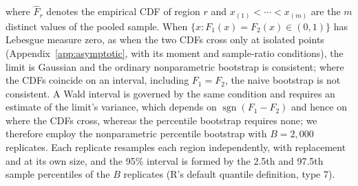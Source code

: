 \documentclass[AMA,Times1COL]{WileyNJDv5}
\begin{document}
where $\hat{F}_r$ denotes the empirical CDF of region $r$ and $x_{(1)} < \cdots < x_{(m)}$ are the $m$ distinct values of the pooled sample. When $\{x : F_1(x) = F_2(x) \in (0,1)\}$ has Lebesgue measure zero, as when the two CDFs cross only at isolated points (Appendix~\ref{app:asymptotic}, with its moment and sample-ratio conditions), the limit is Gaussian and the ordinary nonparametric bootstrap is consistent;\cite{fang2019} where the CDFs coincide on an interval, including $F_1 = F_2$, the naive bootstrap is not consistent.\cite{dumbgen1993,fang2019,sommerfeld2018} A Wald interval is governed by the same condition and requires an estimate of the limit's variance, which depends on $\operatorname{sgn}(F_1 - F_2)$ and hence on where the CDFs cross, whereas the percentile bootstrap requires none; we therefore employ the nonparametric percentile bootstrap with $B = 2{,}000$ replicates.\cite{efron1993} Each replicate resamples each region independently, with replacement and at its own size, and the 95\% interval is formed by the 2.5th and 97.5th sample percentiles of the $B$ replicates (R's default quantile definition, type 7).
\end{document}
